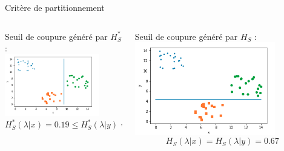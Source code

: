 \documentclass[usenames,dvipsnames]{beamer}
\begin{document}
\begin{frame}{Critère de partitionnement}
    \begin{columns}
        \begin{column}{0.5\textwidth}
            \centering
            Seuil de coupure généré par $H^*_S$ : \\
            \includegraphics[width=0.8\textwidth]{threshold_rsdm.png}
            $$H^*_S(\lambda | x) =  0.19 \leq H^*_S(\lambda | y) =  0.53$$
        \end{column}
        \begin{column}{0.5\textwidth}
            \centering
            Seuil de coupure généré par $H_S$ :
	    \includegraphics[width=0.8\textwidth]{threshold_sdm.png}
        $$H_S(\lambda | x) = H_S(\lambda | y) =  0.67$$
        \end{column}
    \end{columns}
\end{frame}
\end{document}
